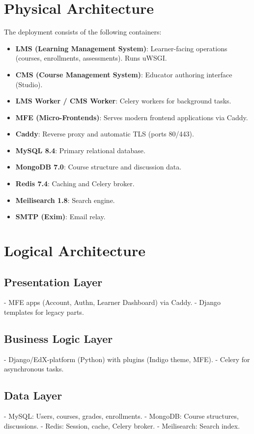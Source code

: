 \section{Physical Architecture}
The deployment consists of the following containers:
\begin{itemize}
    \item \textbf{LMS (Learning Management System)}: Learner-facing operations (courses, enrollments, assessments). Runs uWSGI.
    \item \textbf{CMS (Course Management System)}: Educator authoring interface (Studio).
    \item \textbf{LMS Worker / CMS Worker}: Celery workers for background tasks.
    \item \textbf{MFE (Micro-Frontends)}: Serves modern frontend applications via Caddy.
    \item \textbf{Caddy}: Reverse proxy and automatic TLS (ports 80/443).
    \item \textbf{MySQL 8.4}: Primary relational database.
    \item \textbf{MongoDB 7.0}: Course structure and discussion data.
    \item \textbf{Redis 7.4}: Caching and Celery broker.
    \item \textbf{Meilisearch 1.8}: Search engine.
    \item \textbf{SMTP (Exim)}: Email relay.
\end{itemize}

\section{Logical Architecture}
\subsection{Presentation Layer}
- MFE apps (Account, Authn, Learner Dashboard) via Caddy.
- Django templates for legacy parts.

\subsection{Business Logic Layer}
- Django/EdX-platform (Python) with plugins (Indigo theme, MFE).
- Celery for asynchronous tasks.

\subsection{Data Layer}
- MySQL: Users, courses, grades, enrollments.
- MongoDB: Course structures, discussions.
- Redis: Session, cache, Celery broker.
- Meilisearch: Search index.

